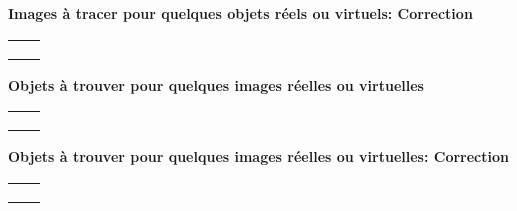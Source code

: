 \documentclass{article}
\newcommand{\titre}[1]{
\begin{center}
  {\Large\textbf{#1}}
\end{center}

}
\begin{document}
\titre{Images \`a tracer pour quelques objets r\'eels ou virtuels: Correction}
\begin{tabular}{|c|c|}
\hline
&\\ \hline
&\\ \hline
&\\ \hline
&\\ \hline
\end{tabular}


\newpage

\titre{Objets \`a trouver pour quelques images r\'eelles ou virtuelles}
\begin{tabular}{|c|c|}
\hline
&\\ \hline
&\\ \hline
&\\ \hline
&\\ \hline
\end{tabular}


\newpage


\titre{Objets \`a trouver pour quelques images r\'eelles ou virtuelles: Correction}
\begin{tabular}{|c|c|}
\hline
&\\ \hline
&\\ \hline
&\\ \hline
&\\ \hline
\end{tabular}
\end{document}
